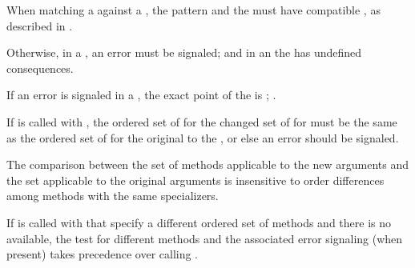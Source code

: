 
When matching a  against a ,
the pattern and the  must have compatible ,
as described in \secref\ExtraDestructureInfo.

Otherwise, in a ,
an error  must be signaled;
and in an  the  has undefined consequences.

If an error is signaled in a ,
the exact point of the  is ;
\seesection\SafeCallDetectionTime.


\endsubsubsection%

If  is called with , the ordered
set of   for the changed set of 
for  must be the same as the ordered set of 
  for the original  to the
, or else an error should be signaled.

The comparison between the set of methods applicable to the
new arguments and the set applicable to the original arguments is
insensitive to order differences among methods with the same
specializers.
 
If  is called with  that specify
a different ordered set of  methods and there is no 
 available, the test for different methods and the 
associated error signaling (when present) takes precedence over calling
.

\endsubsubsection%

\endsubSection%

